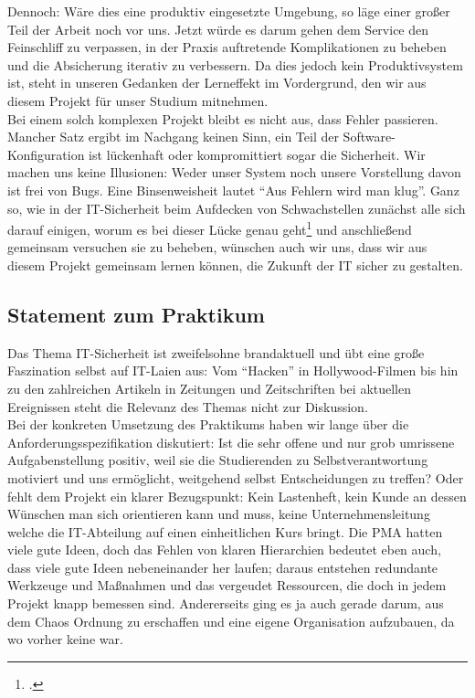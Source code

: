 Dennoch: Wäre dies eine produktiv eingesetzte Umgebung, so läge einer großer Teil der Arbeit noch vor uns. Jetzt würde es darum gehen dem Service den Feinschliff zu verpassen, in der Praxis auftretende Komplikationen zu beheben und die Absicherung iterativ zu verbessern. Da dies jedoch kein Produktivsystem ist, steht in unseren Gedanken der Lerneffekt im Vordergrund, den wir aus diesem Projekt für unser Studium mitnehmen. \\

Bei einem solch komplexen Projekt bleibt es nicht aus, dass Fehler passieren. Mancher Satz ergibt im Nachgang keinen Sinn, ein Teil der Software-Konfiguration ist lückenhaft oder kompromittiert sogar die Sicherheit. Wir machen uns keine Illusionen: Weder unser System noch unsere Vorstellung davon ist frei von Bugs. Eine Binsenweisheit lautet "`Aus Fehlern wird man klug"'. Ganz so, wie in der IT-Sicherheit beim Aufdecken von Schwachstellen zunächst alle sich darauf einigen, worum es bei dieser Lücke genau geht\footcite{wikiCVE} und anschließend gemeinsam versuchen sie zu beheben, wünschen auch wir uns, dass wir aus diesem Projekt gemeinsam lernen können, die Zukunft der IT sicher zu gestalten.

\subsection{Statement zum Praktikum}
Das Thema IT-Sicherheit ist zweifelsohne brandaktuell und übt eine große Faszination selbst auf IT-Laien aus: Vom "`Hacken"' in Hollywood-Filmen bis hin zu den zahlreichen Artikeln in Zeitungen und Zeitschriften bei aktuellen Ereignissen steht die Relevanz des Themas nicht zur Diskussion.\\

Bei der konkreten Umsetzung des Praktikums haben wir lange über die Anforderungsspezifikation diskutiert: Ist die sehr offene und nur grob umrissene Aufgabenstellung positiv, weil sie die Studierenden zu Selbstverantwortung motiviert und uns ermöglicht, weitgehend selbst Entscheidungen zu treffen? Oder fehlt dem Projekt ein klarer Bezugspunkt: Kein Lastenheft, kein Kunde an dessen Wünschen man sich orientieren kann und muss, keine Unternehmensleitung welche die IT-Abteilung auf einen einheitlichen Kurs bringt. Die PMA hatten viele gute Ideen, doch das Fehlen von klaren Hierarchien bedeutet eben auch, dass viele gute Ideen nebeneinander her laufen; daraus entstehen redundante Werkzeuge und Maßnahmen und das vergeudet Ressourcen, die doch in jedem Projekt knapp bemessen sind. Andererseits ging es ja auch gerade darum, aus dem Chaos Ordnung zu erschaffen und eine eigene Organisation aufzubauen, da wo vorher keine war.\\

